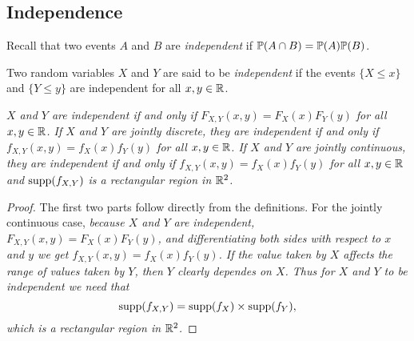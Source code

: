 \subsection{Independence}

Recall that two events $A$ and $B$ are \emph{independent} if $\mathbb{P}(A\cap B)=\mathbb{P}(A)\mathbb{P}(B)$.

\begin{definition}
Two random variables $X$ and $Y$ are said to be \emph{independent} if the events $\{X\leq x\}$ and $\{Y\leq y\}$ are independent for all $x,y\in\mathbb{R}$.
\end{definition}

\begin{lemma}\label{lem:product_marginal_cdfs}
\ben
\it $X$ and $Y$ are independent if and only if $F_{X,Y}(x,y) = F_X(x)F_Y(y)$ for all $x,y\in\mathbb{R}$.
\it If $X$ and $Y$ are jointly discrete, they are independent if and only if $f_{X,Y}(x,y) =f_X(x) f_Y(y)$ for all $x,y\in\mathbb{R}$.
\it If $X$ and $Y$ are jointly continuous, they are independent if and only if $f_{X,Y}(x,y) = f_X(x)f_Y(y)$ for all $x,y\in\mathbb{R}$ and $\text{supp}(f_{X,Y})$ is a rectangular region in $\mathbb{R}^2$.
\een
\end{lemma}
\begin{proof}
The first two parts follow directly from the definitions. For the jointly continuous case,
\bit
\it because $X$ and $Y$ are independent, $F_{X,Y}(x,y)=F_X(x)F_Y(y)$, and differentiating both sides with respect to $x$ and $y$ we get $f_{X,Y}(x,y)=f_X(x)f_Y(y)$. 
\it If the value taken by $X$ affects the range of values taken by $Y$, then $Y$ clearly dependes on $X$. Thus for $X$ and $Y$ to be independent we need that
\[
\text{supp}(f_{X,Y}) = \text{supp}(f_X)\times \text{supp}(f_Y),
\]
which is a rectangular region in $\mathbb{R}^2$.
\eit
\end{proof}

